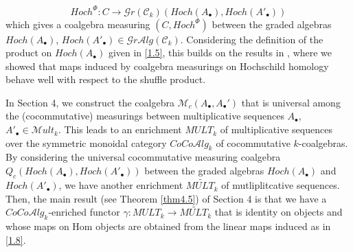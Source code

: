 \documentclass[10pt, colorlinks]{article}
\numberwithin{equation}{section} \DeclareMathSizes{2}{10}{12}{13}
\begin{document}
            \begin{equation}\label{1.8}
            Hoch^\Phi: C\longrightarrow \mathscr Gr(\mathcal C_{k})(Hoch(A_\bullet),Hoch(A'_\bullet))
            \end{equation} which gives a coalgebra measuring $(C,Hoch^\Phi)$  between the graded algebras $Hoch(A_\bullet)$, $Hoch(A'_\bullet)\in \mathscr Gr\mathcal Alg(\mathcal C_k) $. Considering the definition of the product on $Hoch(A_\bullet)$ given in \eqref{1.5}, this builds on the results in \cite{AB}, where we showed that maps induced by coalgebra measurings on Hochschild homology behave well with respect to the shuffle product. 
            
            \smallskip
            In Section 4, we construct the coalgebra $\mathcal M_c(A_\bullet, A_\bullet')$ that is universal among the (cocommutative) measurings between multiplicative sequences 
            $A_\bullet$, $A'_\bullet\in \mathscr{M}ult_k$. This leads to an enrichment $MULT_k$ of multiplicative sequences over the symmetric monoidal category $CoCo\mathcal Alg_k$ of cocommutative $k$-coalgebras. By considering the universal cocommutative measuring coalgebra $Q_c(Hoch(A_\bullet), Hoch(A'_\bullet) )$ between the graded algebras  $Hoch(A_\bullet)$ and $Hoch(A'_\bullet)$, we have another enrichment $\widetilde{MULT_k}$ of mutliplitcative sequences. Then, the  main result (see Theorem \ref{thm4.5}) of Section 4 is that we have a  $CoCo\mathcal Alg_k$-enriched functor $\gamma: MULT_k\longrightarrow \widetilde{MULT_k}$ that is identity on objects and whose maps on Hom objects are obtained from the linear maps induced as in \eqref{1.8}. 
            
\end{document}
